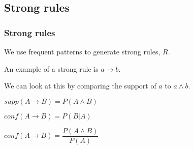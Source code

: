 
\subsection{Strong rules}

\subsubsection{Strong rules}

We use frequent patterns to generate strong rules, \(R\).

An example of a strong rule is \(a\rightarrow b\).

We can look at this by comparing the support of \(a\) to \(a\land b\).

\(supp(A\rightarrow B)=P(A\land B)\)

\(conf(A\rightarrow B)=P(B|A)\)

\(conf(A\rightarrow B)=\dfrac{P(A\land B)}{P(A)}\)

